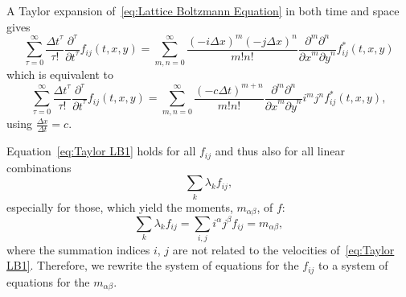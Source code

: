 \documentclass{article}
\begin{document}
A Taylor expansion of~\eqref{eq:Lattice Boltzmann Equation} in both time and space gives
\begin{equation*}
  \sum_{\tau = 0}^\infty \frac{{\Delta t}^\tau }{\tau!} \frac{\partial^\tau}{{\partial t}^\tau} f_{ij}(t, x, y) =
  \sum_{m,n = 0}^\infty \frac{{(-i\Delta x)}^m{(-j\Delta x)}^n} {m!n!} \frac{\partial^m \partial^n}{ {\partial x}^m{\partial y}^n} f^*_{ij}(t, x, y)
\end{equation*}
which is equivalent to
\begin{equation}
  \label{eq:Taylor LB1}
  \sum_{\tau = 0}^\infty \frac{{\Delta t}^\tau }{\tau!} \frac{\partial^\tau}{{\partial t}^\tau} f_{ij}(t, x, y) =
    \sum_{m,n = 0}^\infty \frac{{(-c\Delta t)}^{m+n}} {m!n!} \frac{\partial^m \partial^n}{ {\partial x}^m{\partial y}^n} i^m j^n f^*_{ij}(t, x, y),
\end{equation}
using $\frac{\Delta x} {\Delta{t}} = c$.

Equation~\eqref{eq:Taylor LB1} holds for all $f_{ij}$ and thus also for all linear combinations
\begin{equation*}
  \sum_{k}\lambda_k f_{ij},
\end{equation*}
especially for those, which yield the moments, $m_{\alpha\beta} $, of $f$:
\begin{equation*}
  \sum_{k}\lambda_k f_{ij} = \sum_{i,j}i^\alpha j^\beta f_{ij}=m_{\alpha\beta},
\end{equation*}
where the summation indices $i$, $j$ are not related to the velocities of~\eqref{eq:Taylor LB1}.
Therefore, we rewrite the system of equations for the $f_{ij}$ to a system of equations for the $m_{\alpha\beta}$.
\end{document}
